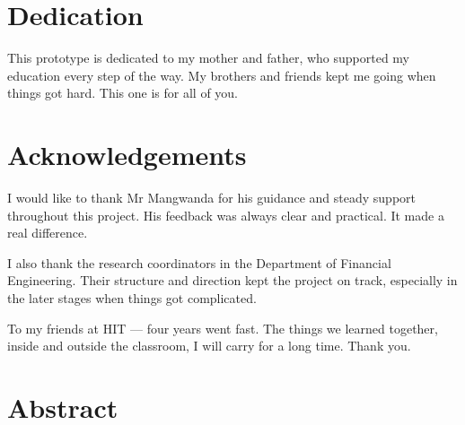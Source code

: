 \documentclass[12pt,a4paper]{article}
\begin{document}
\newpage

{}
\section*{Dedication}

This prototype is dedicated to my mother and father, who supported my education every step of the way. My brothers and friends kept me going when things got hard. This one is for all of you.

\newpage

{}
\section*{Acknowledgements}

I would like to thank Mr Mangwanda for his guidance and steady support throughout this project. His feedback was always clear and practical. It made a real difference.

I also thank the research coordinators in the Department of Financial Engineering. Their structure and direction kept the project on track, especially in the later stages when things got complicated.

To my friends at HIT --- four years went fast. The things we learned together, inside and outside the classroom, I will carry for a long time. Thank you.

\newpage

\tableofcontents
\newpage

\listoffigures
\newpage

\listoftables
\newpage

{}
\section*{Abstract}
\end{document}
